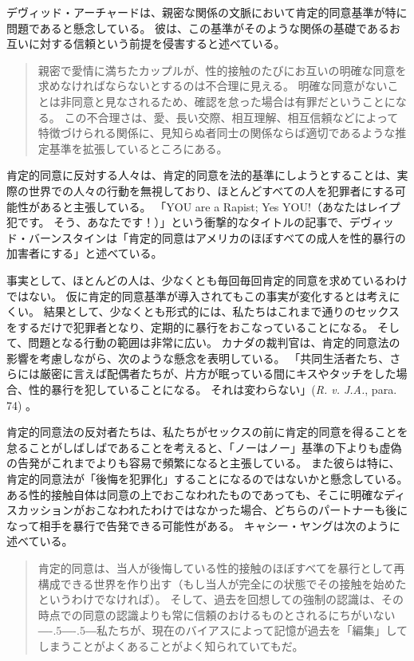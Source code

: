 \documentclass[paper=a4,book,openany]{jlreq}
\newcommand{\ig}[1]{}           %
\def\DDASH{―\kern-.5\zw―\kern-.5\zw―}
\begin{document}
デヴィッド・アーチャードは、親密な関係の文脈において肯定的同意基準が特に問題であると懸念している。
彼は、この基準がそのような関係の基礎であるお互いに対する信頼という前提を侵害すると述べている。

\begin{quote}
親密で愛情に満ちたカップルが、性的接触のたびにお互いの明確な同意を求めなければならないとするのは不合理に見える。
明確な同意がないことは非同意と見なされるため、確認を怠った場合は有罪だということになる。
この不合理さは、愛、長い交際、相互理解、相互信頼などによって特徴づけられる関係に、見知らぬ者同士の関係ならば適切であるような推定基準を拡張しているところにある。
\citep[p.146]{archard98:_sexual_consen}
\end{quote}

肯定的同意に反対する人々は、肯定的同意を法的基準にしようとすることは、実際の世界での人々の行動を無視しており、ほとんどすべての人を犯罪者にする可能性があると主張している。
「YOU are a Rapist; Yes YOU!（あなたはレイプ犯です。
そう、あなたです！）」という衝撃的なタイトルの記事で、デヴィッド・バーンスタイン\ig{David Bernstein}は「肯定的同意はアメリカのほぼすべての成人を性的暴行の加害者にする」と述べている\citep{bernstein14:_you_are_rapis}。
\ig{David Bernstein}
事実として、ほとんどの人は、少なくとも毎回毎回肯定的同意を求めているわけではない。
仮に肯定的同意基準が導入されてもこの事実が変化するとは考えにくい。
結果として、少なくとも形式的には、私たちはこれまで通りのセックスをするだけで犯罪者となり、定期的に暴行をおこなっていることになる。
そして、問題となる行動の範囲は非常に広い。
カナダの裁判官は、肯定的同意法の影響を考慮しながら、次のような懸念を表明している。
「共同生活者たち、さらには厳密に言えば配偶者たちが、片方が眠っている間にキスやタッチをした場合、性的暴行を犯していることになる。
それは変わらない」(\emph{R. v. J.A.}, \ig{2011 SCC 28,} para. 74\ig{\footnote{\url{https://scc-csc.lexum.com/scc-csc/scc-csc/en/item/7942/index.do}.}}) 。

肯定的同意法の反対者たちは、私たちがセックスの前に肯定的同意を得ることを怠ることがしばしばであることを考えると、「ノーはノー」基準の下よりも虚偽の告発がこれまでよりも容易で頻繁になると主張している。
また彼らは特に、肯定的同意法が「後悔を犯罪化」することになるのではないかと懸念している。
ある性的接触自体は同意の上でおこなわれたものであっても、そこに明確なディスカッションがおこなわれたわけではなかった場合、どちらのパートナーも後になって相手を暴行で告発できる可能性がある。
キャシー・ヤングは次のように述べている。

\begin{quote}
肯定的同意は、当人が後悔している性的接触のほぼすべてを暴行として再構成できる世界を作り出す（もし当人が完全にの状態でその接触を始めたというわけでなければ）。
そして、過去を回想しての強制の認識は、その時点での同意の認識よりも常に信頼のおけるものとされるにちがいない{\DDASH}私たちが、現在のバイアスによって記憶が過去を「編集」してしまうことがよくあることがよく知られていてもだ。
\citep{young15:_femin_want_us_defin_these}
\end{quote}
\end{document}
